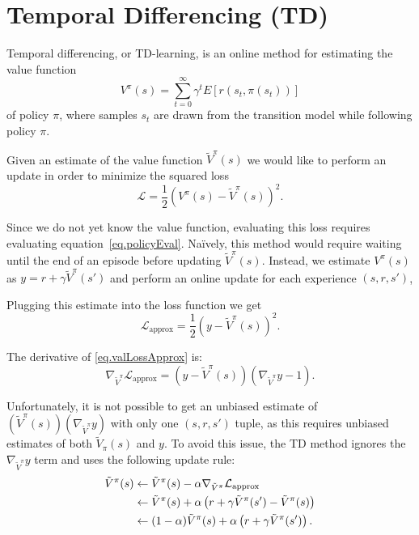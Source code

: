 \documentclass[11pt]{article}
\numberwithin{equation}{section}
\numberwithin{figure}{section}
\begin{document}
\section{Temporal Differencing (TD)}
Temporal differencing, or TD-learning, is an online method for estimating the
value function
\begin{equation}
	V^\pi(s) = \sum_{t = 0}^\infty \gamma^t E\left[ r(s_t,\pi(s_t)) \right]
	\label{eq.policyEval}
\end{equation}
of policy $\pi$, where samples $s_t$ are drawn from the transition model while
following policy $\pi$.

Given an estimate of the value function $\tilde{V}^\pi(s)$ we would like to
perform an update in order to minimize the squared loss
\begin{equation}
	\mathcal{L} = \frac{1}{2} \left(V^\pi(s) - \tilde{V}^\pi(s) \right)^2.
	\label{eq.valLoss}
\end{equation}

Since we do not yet know the value function, evaluating this loss requires
evaluating equation~\ref{eq.policyEval}. Na\"{i}vely, this method would require
waiting until the end of an episode before updating $\tilde{V}^\pi(s)$. Instead,
we estimate $V^\pi(s)$ as $y = r + \gamma \tilde{V}^\pi(s')$ and perform an
online update for each experience $(s, r, s')$,

Plugging this estimate into the loss function we get
\begin{equation}
	\mathcal{L}_\text{approx} = \frac{1}{2} \left(y - \tilde{V}^\pi(s) \right)^2.
	\label{eq.valLossApprox}
\end{equation}

The derivative of \cref{eq.valLossApprox} is:
\begin{equation}
    \nabla_{\tilde{V}^\pi}\mathcal{L}_\text{approx} = \left(y - \tilde{V}^\pi(s) \right) \left(\nabla_{\tilde{V}^\pi} y - 1 \right).
    \label{eq.valGrad}
\end{equation}

Unfortunately, it is not possible to get an unbiased estimate of
$(\tilde{V}^\pi(s))(\nabla_{\tilde{V}^\pi}y)$ with only one
$(s,r,s')$ tuple, as this requires unbiased estimates of both
$\tilde{V}_\pi(s)$ and $y$. To avoid this issue, the TD method ignores the
$\nabla_{\tilde{V}^\pi} y$ term and uses the following update rule:
\begin{align}
    \tilde{V}^\pi(s) &\gets \tilde{V}^\pi(s) - \alpha \nabla_{\tilde{V}^\pi}\mathcal{L}_\text{approx} \notag \\
                     &\gets \tilde{V}^\pi(s) + \alpha \left(r + \gamma \tilde{V}^\pi(s') - \tilde{V}^\pi(s) \right) \notag \\
                     &\gets (1 - \alpha) \tilde{V}^\pi(s) + \alpha \left(r+ \gamma \tilde{V}^\pi(s') \right). 
    \label{eq.valUpdate}
\end{align}
\end{document}
